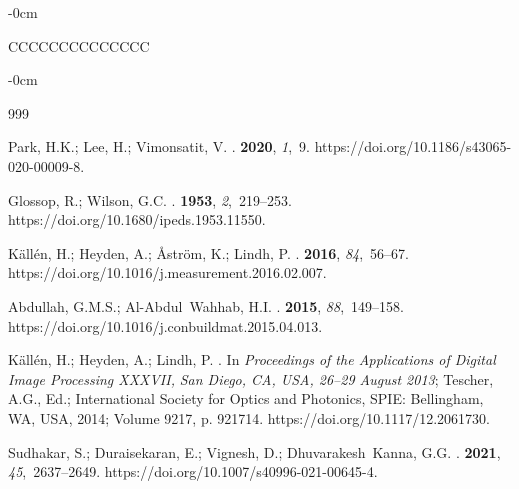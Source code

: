 \documentclass[materials,article,accept,pdftex,moreauthors]{Definitions/mdpi}
\begin{document}
\begin{table}[H]
\begin{adjustwidth}{-\extralength}{0cm}
\begin{tabularx}{\fulllength}{CCCCCCCCCCCCCC}
        \bottomrule
\end{tabularx}
\end{adjustwidth}
\end{table}


\begin{adjustwidth}{-\extralength}{0cm}
 

\begin{thebibliography}{999}

Park, H.K.; Lee, H.; Vimonsatit, V.
.
 {\bf
  2020}, {\em 1},~9. https://doi.org/10.1186/s43065-020-00009-8.

Glossop, R.; Wilson, G.C.
.
 {\bf 1953},
  {\em 2},~219--253. https://doi.org/10.1680/ipeds.1953.11550.

Källén, H.; Heyden, A.; Åström, K.; Lindh, P.
.
 {\bf 2016}, {\em 84},~56--67. https://doi.org/10.1016/j.measurement.2016.02.007.

Abdullah, G.M.S.; Al-Abdul~Wahhab, H.I.
.
 {\bf 2015}, {\em
  88},~149--158. https://doi.org/10.1016/j.conbuildmat.2015.04.013.

Källén, H.; Heyden, A.; Lindh, P.
.
\newblock  In \emph{Proceedings of the Applications of Digital Image Processing XXXVII,} \emph{{San Diego, CA, USA, 26--29 August 2013}}; Tescher, A.G., Ed.;
  International Society for Optics and Photonics, SPIE: Bellingham, WA, USA,
  2014; Volume 9217, p. 921714. https://doi.org/10.1117/12.2061730.

Sudhakar, S.; Duraisekaran, E.; Vignesh, D.; Dhuvarakesh~Kanna, G.G.
.
 {\bf 2021}, {\em 45},~2637--2649. https://doi.org/10.1007/s40996-021-00645-4.


\end{thebibliography}
\end{adjustwidth}
\end{document}
